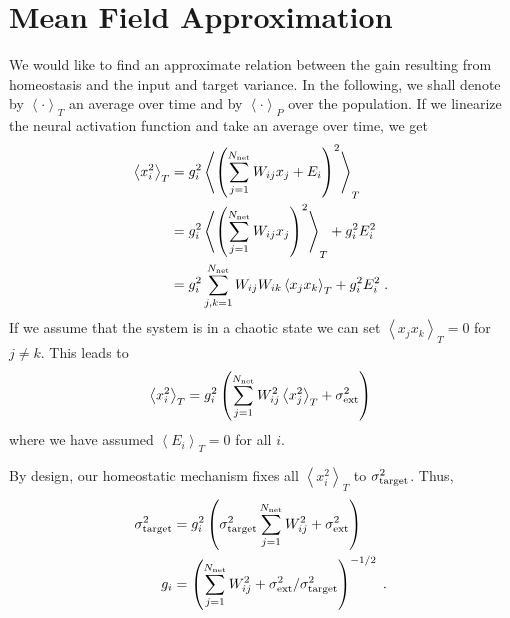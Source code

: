 \documentclass[10pt,a4paper]{article}
\newcommand{\avgt}[1]{\left< #1 \right>_T}
\newcommand{\avgp}[1]{\left< #1 \right>_P}
\begin{document}
\section{Mean Field Approximation}

We would like to find an approximate relation between the gain resulting from homeostasis and the input and target variance. In the following, we shall denote by $\avgt{\cdot}$ an average over time and by $\avgp{\cdot}$ over the population. If we linearize the neural activation function and take an average over time, we get
\begin{align}
	\avgt{x_i^2} &= g_i^2 \avgt{\left(\sum_{j=1}^{N_{\rm net}} W_{ij} x_j + E_i\right)^2} \\
	&= g_i^2 \avgt{\left( \sum_{j=1}^{N_{\rm net}} W_{ij} x_j \right)^2} + g_i^2 E_i^2 \\
	&= g_i^2 \sum_{j,k=1}^{N_{\rm net}} W_{ij}W_{ik} \avgt{x_j x_k} + g_i^2 E_i^2 \; .
\end{align}
If we assume that the system is in a chaotic state we can set $\avgt{x_j x_k}=0$ for $j\neq k$. This leads to
\begin{equation}
	\avgt{x_i^2} = g_i^2 \left( \sum_{j=1}^{N_{\rm net}} W_{ij}^2 \avgt{x_j^2} + \sigma_{\rm ext}^2 \right)
\end{equation}
where we have assumed $\avgt{E_i} = 0$ for all $i$.

By design, our homeostatic mechanism fixes all $\avgt{x_i^2}$ to $\sigma_{\rm target}^2$. Thus,
\begin{align}
	\sigma_{\rm target}^2 &= g_i^2 \left( \sigma_{\rm target}^2 \sum_{j=1}^{N_{\rm net}} W_{ij}^2 + \sigma_{\rm ext}^2 \right) \\
	g_i &= \left(\sum_{j=1}^{N_{\rm net}} W_{ij}^2 + \sigma_{\rm ext}^2 / \sigma_{\rm target}^2\right)^{-1/2} \; .
\end{align}
\end{document}
